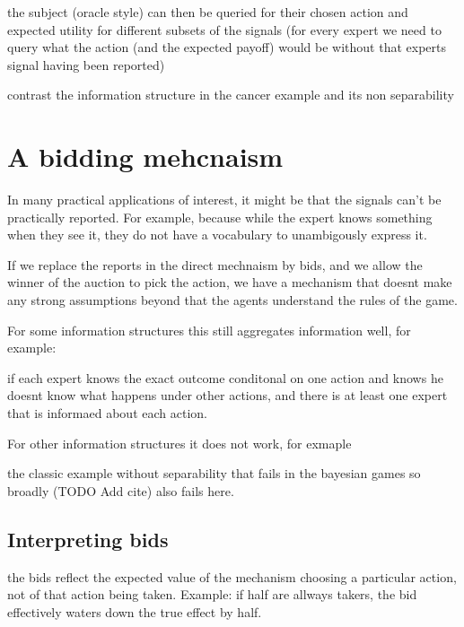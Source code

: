the subject (oracle style) can then be queried for their chosen action and expected utility for different subsets of the signals (for every expert we need to query what the action (and the expected payoff) would be without that experts signal having been reported)

contrast the information structure in the cancer example and its non separability 


\section{A bidding mehcnaism }

In many practical applications of interest, it might be that the signals can't be practically reported. For example, because while the expert knows something when they see it, they do not have a vocabulary to unambigously express it. 


If we replace the reports in the direct mechnaism by bids, and we allow the winner of the auction to pick the action, we have a mechanism that doesnt make any strong assumptions beyond that the agents understand the rules of the game.

For some information structures this still aggregates information well, for example:

\begin{lem}
	if each expert knows the exact outcome conditonal on one action and knows he doesnt know what happens under other actions, and there is at least one expert that is informaed about each action.
\end{lem}

For other information structures it does not work, for exmaple 
\begin{eg}
	the classic example without separability that fails in the bayesian games so broadly (TODO Add cite) also fails here. 
\end{eg}


\subsection{Interpreting bids}

the bids reflect the expected value of the mechanism choosing a particular action, not of that action being taken.  Example: if half are allways takers, the bid effectively waters down the true effect by half.

